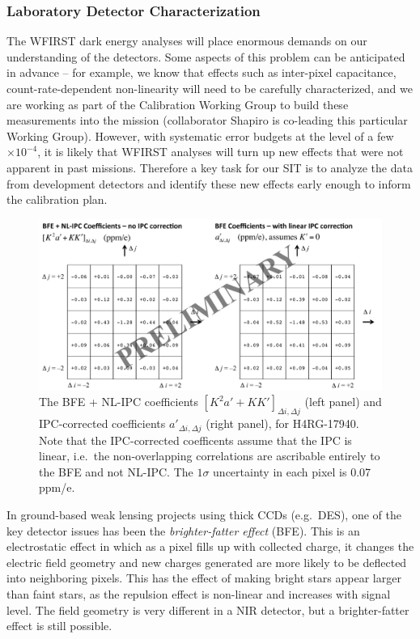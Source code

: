 \subsubsection{Laboratory Detector Characterization}

The WFIRST dark energy analyses will place enormous demands on our understanding
of the detectors. Some aspects of this problem can be anticipated in advance --
for example, we know that effects such as inter-pixel capacitance,
count-rate-dependent non-linearity  will need to be carefully
characterized, and we are working as part of the Calibration Working Group to
build these measurements into the mission (collaborator Shapiro is co-leading this particular Working Group). However, with systematic error
budgets at the level of a few$\times 10^{-4}$, it is likely that WFIRST analyses
will turn up new effects that were not apparent in past missions. Therefore a
key task for our SIT is to analyze the data from development detectors and
identify these new effects early enough to inform the calibration plan.

\begin{figure}[!t]
  \includegraphics[width=6.2in]{Plots/kernel-17940B.pdf}
\caption{\label{fig:kernel}The BFE + NL-IPC coefficients $[K^2a'+KK']_{\Delta
i,\Delta j}$ (left panel) and IPC-corrected coefficients $a'_{\Delta i,\Delta
j}$ (right panel), for H4RG-17940. Note that the IPC-corrected coefficents
assume that the IPC is linear, i.e.\ the non-overlapping correlations are
ascribable entirely to the BFE and not NL-IPC. The $1\sigma$ uncertainty in each
pixel is 0.07 ppm/e.}
\end{figure}

In ground-based weak lensing projects using thick CCDs (e.g.\ DES), one of the
key detector issues has been the {\em brighter-fatter effect} (BFE). This is an
electrostatic effect in which as a pixel fills up with collected charge, it
changes the electric field geometry and new charges generated are more likely to
be deflected into neighboring pixels. This has the effect of making bright stars
appear larger than faint stars, as the repulsion effect is non-linear and
increases with signal level. The field geometry is very different in a NIR
detector, but a brighter-fatter effect is still possible.


